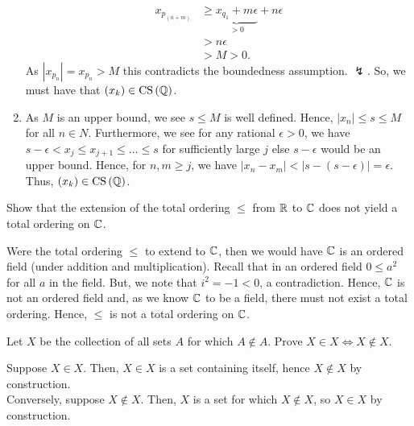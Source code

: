 \documentclass[a4paper]{article}
\begin{document}
\begin{solution}
\begin{enumerate}
\begin{align*}
	x_{p_{(n + m)}} &\ge\underbrace{ x_{q_1} + m\epsilon}_{> 0} + n \epsilon\\
		      &>   n \epsilon\\
		      &> M > 0
.\end{align*}
As \(\left| x_{p_{n}} \right| = x_{p_{n}} > M \) this contradicts the boundedness assumption. \(\lightning\). So, we must have that \(\left( x_{k} \right) \in \operatorname{CS} \left( \mathbb{Q} \right) \).
\item	As \(M\) is an upper bound, we see \(s\le M\) is well defined. Hence, \(\left| x_{n} \right|  \le s \le M\) for all \(n \in N\). Furthermore, we see for any rational \(\epsilon > 0\), we have \(s - \epsilon < x_{j} \le x_{j+1} \le \ldots \le s\) for sufficiently large \(j\) else \(s -\epsilon\) would be an upper bound. Hence, for \(n, m \ge j\), we have \(\left| x_{n} - x_{m} \right| < \left| s - \left( s - \epsilon \right)  \right|  = \epsilon\). Thus, \(\left( x_{k} \right) \in \operatorname{CS} \left( \mathbb{Q} \right) \).
	\end{enumerate}
\end{solution}
\newpage
\begin{problem}[12]
	Show that the extension of the total ordering \(\le\) from \(\mathbb{R}\) to \(\mathbb{C}\) does not yield a total ordering on \(\mathbb{C}\).
\end{problem}
\begin{solution}
	Were the total ordering \(\le \) to extend to \(\mathbb{C}\), then we would have \(\mathbb{C}\) is an ordered field (under addition and multiplication). Recall that in an ordered field \(0 \le a^2\) for all \(a\) in the field. But, we note that \(i^2 = -1 < 0\), a contradiction. Hence, \(\mathbb{C}\) is not an ordered field and, as we know \(\mathbb{C}\) to be a field, there must not exist a total ordering. Hence, \(\le \) is not a total ordering on \(\mathbb{C}\).

\end{solution}
\newpage
\begin{problem}[13]
Let \(X\) be the collection of all sets \(A\) for which \(A \not\in A\). Prove \(X \in X \iff X \not\in X\).
\end{problem}
\begin{solution}
	Suppose \(X \in X\). Then, \(X \in X\) is a set containing itself, hence \(X \not\in X\) by construction.\\
	Conversely, suppose \(X \not\in X\). Then, \(X\) is a set for which \(X \not\in X\), so \(X \in X\) by construction.
\end{solution}
\end{document}
